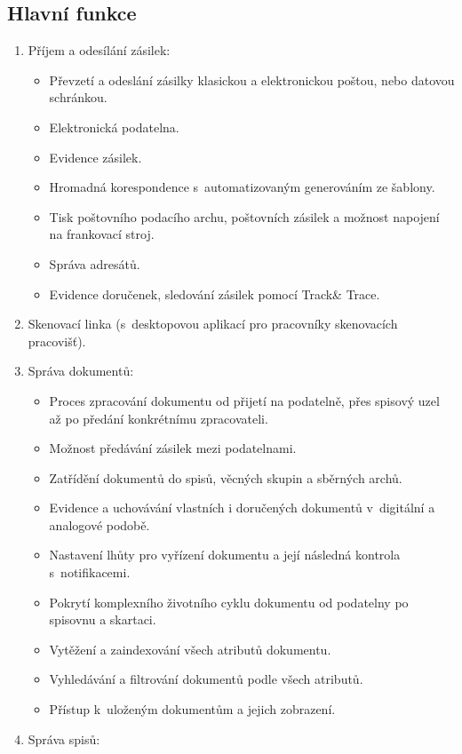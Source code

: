 \documentclass[
  master,
  field=ainfp,
  biblatex,
  language=czech,
  glossaries,
  theorems=false,
  index
]{kidiplom}
\begin{document}
\subsection{Hlavní funkce}
\begin{enumerate}
	\item Příjem a odesílání zásilek:
	\begin{itemize}
		\item Převzetí a odeslání zásilky klasickou a elektronickou poštou, nebo datovou schránkou.
		\item Elektronická podatelna.
		\item Evidence zásilek.
		\item Hromadná korespondence s~automatizovaným generováním ze šablony.
		\item Tisk poštovního podacího archu, poštovních zásilek a možnost napojení na frankovací stroj.
		\item Správa adresátů.
		\item Evidence doručenek, sledování zásilek pomocí Track\& Trace. 
	\end{itemize}
	\item Skenovací linka (s~desktopovou aplikací pro pracovníky skenovacích pracovišť).
	\item Správa dokumentů:
	\begin{itemize}
		\item Proces zpracování dokumentu od přijetí na podatelně, přes spisový uzel až po předání konkrétnímu zpracovateli.
		\item Možnost předávání zásilek mezi podatelnami.
		\item Zatřídění dokumentů do spisů, věcných skupin a sběrných archů.
		\item Evidence a uchovávání vlastních i doručených dokumentů v~digitální a analogové podobě. 
		\item Nastavení lhůty pro vyřízení dokumentu a její následná kontrola s~notifikacemi.
		\item Pokrytí komplexního životního cyklu dokumentu od podatelny po spisovnu a skartaci.
		\item Vytěžení a zaindexování všech atributů dokumentu.
		\item Vyhledávání a filtrování dokumentů podle všech atributů.
		\item Přístup k~uloženým dokumentům a jejich zobrazení.
	\end{itemize}
	\item Správa spisů:
	\begin{itemize}

\end{itemize}
\end{enumerate}
\end{document}
